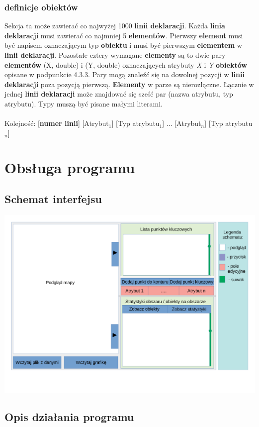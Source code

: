 \documentclass[hidelinks,10pt,a4paper]{article}
\begin{document}
\subsubsection{definicje obiektów}
Sekcja ta może zawierać co najwyżej 1000 \textbf{linii deklaracji}.
Każda \textbf{linia deklaracji} musi zawierać co najmniej 5 \textbf{elementów}. 
Pierwszy \textbf{element} musi być napisem oznaczającym typ \textbf{obiektu} i musi być pierwszym \textbf{elementem} w \textbf{linii deklaracji}.
Pozostałe cztery wymagane \textbf{elementy} są to dwie pary \textbf{elementów} (X, double) i (Y, double) oznaczających atrybuty \textit{X} i \textit{Y} \textbf{obiektów} opisane w podpunkcie 4.3.3. Pary mogą znaleźć się na dowolnej pozycji w \textbf{linii deklaracji} poza pozycją pierwszą. \textbf{Elementy} w parze są nierozłączne.
Łącznie w jednej \textbf{linii deklaracji} może znajdować się sześć par (nazwa atrybutu, typ atrybutu).
Typy muszą być pisane małymi literami.
\\\\Kolejność: [\textbf{numer linii}] [Atrybut$_{1}$] [Typ atrybutu$_{1}$] ... [Atrybut$_{n}$] [Typ atrybutu$_{n}$]
\section{Obsługa programu}

\subsection{Schemat interfejsu}
\includegraphics[width = \textwidth]{gui.pdf}

\subsection{Opis działania programu}
\end{document}
